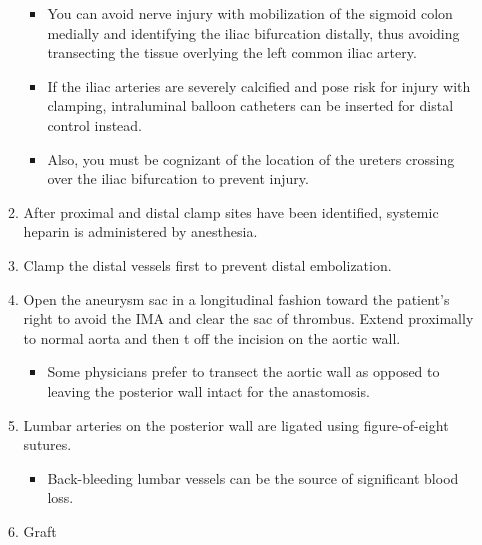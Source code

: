 \documentclass[
]{book}
\providecommand{\tightlist}{%
  \setlength{\itemsep}{0pt}\setlength{\parskip}{0pt}}
\begin{document}
\begin{itemize}
\begin{enumerate}
    \begin{itemize}
    \item
      You can avoid nerve injury with mobilization of the sigmoid
      colon medially and identifying the iliac bifurcation
      distally, thus avoiding transecting the tissue overlying the
      left common iliac artery.
    \item
      If the iliac arteries are severely calcified and pose risk
      for injury with clamping, intraluminal balloon catheters can
      be inserted for distal control instead.
    \item
      Also, you must be cognizant of the location of the ureters
      crossing over the iliac bifurcation to prevent injury.
    \end{itemize}
  \item
    After proximal and distal clamp sites have been identified,
    systemic heparin is administered by anesthesia.
  \item
    Clamp the distal vessels first to prevent distal embolization.
  \item
    Open the aneurysm sac in a longitudinal fashion toward the
    patient's right to avoid the IMA and clear the sac of thrombus.
    Extend proximally to normal aorta and then t off the incision on
    the aortic wall.

    \begin{itemize}
    \tightlist
    \item
      Some physicians prefer to transect the aortic wall as
      opposed to leaving the posterior wall intact for the
      anastomosis.
    \end{itemize}
  \item
    Lumbar arteries on the posterior wall are ligated using
    figure-of-eight sutures.

    \begin{itemize}
    \tightlist
    \item
      Back-bleeding lumbar vessels can be the source of
      significant blood loss.
    \end{itemize}
  \item
    Graft


\end{enumerate}
\end{itemize}
\end{document}
